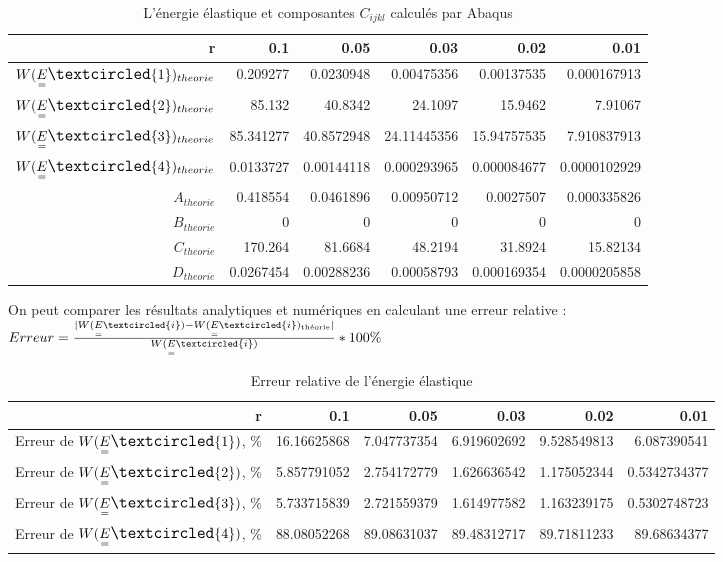 \documentclass{article}
\newcommand\WE[1]{W(\underset{=}{E}\large{\textcircled{\small{#1}}})}
\begin{document}
\begin{table}[H]
    \begin{tabular}{|r|r|r|r|r|r|}
    \hline
    r  & 0.1       & 0.05 & 0.03        & 0.02        & 0.01                                                                         \\ \hline
    $\WE{1}_{theorie}$ & 0.209277  & 0.0230948  & 0.00475356  & 0.00137535  & 0.000167913 \\ \hline
    $\WE{2}_{theorie}$ & 85.132    & 40.8342 & 24.1097     & 15.9462     & 7.91067                 \\ \hline
    $\WE{3}_{theorie}$ & 85.341277 & 40.8572948 & 24.11445356 & 15.94757535 & 7.910837913     \\ \hline
    $\WE{4}_{theorie}$                & 0.0133727 & 0.00144118 & 0.000293965 & 0.000084677 & 0.0000102929          \\ \hline
    $A_{theorie}$  & 0.418554  & 0.0461896 & 0.00950712  & 0.0027507   & 0.000335826                                         \\ \hline
    $B_{theorie}$ & 0         & 0 & 0           & 0           & 0                            \\ \hline
    $C_{theorie}$ & 170.264   & 81.6684   & 48.2194     & 31.8924     & 15.82134                     \\ \hline
    $D_{theorie}$ & 0.0267454 & 0.00288236 & 0.00058793  & 0.000169354 & 0.0000205858                 \\ \hline
    \end{tabular}
    \caption{L'énergie élastique et composantes $C_{ijkl}$ calculés par Abaqus}
\end{table}

On peut comparer les résultats analytiques et numériques en calculant une erreur relative :
$Erreur = \frac{|\WE{i} - \WE{i}_{\text{théorie}}|}{\WE{i}}*100\%$
\begin{table}[H]
    \begin{tabular}{|r|r|r|r|r|r|}
        \hline
        r  & 0.1       & 0.05 & 0.03        & 0.02        & 0.01         \\ \hline
        Erreur de $\WE{1}$, \% & 16.16625868 & 7.047737354 & 6.919602692 & 9.528549813 & 6.087390541 \\ \hline
        Erreur de $\WE{2}$, \% & 5.857791052 & 2.754172779   & 1.626636542 & 1.175052344 & 0.5342734377  \\ \hline
        Erreur de $\WE{3}$, \% & 5.733715839 & 2.721559379   & 1.614977582 & 1.163239175 & 0.5302748723  \\ \hline
        Erreur de $\WE{4}$, \% & 88.08052268 & 89.08631037   & 89.48312717 & 89.71811233 & 89.68634377 \\ \hline
    \end{tabular}
    \caption{Erreur relative de l'énergie élastique}
\end{table}
\end{document}
